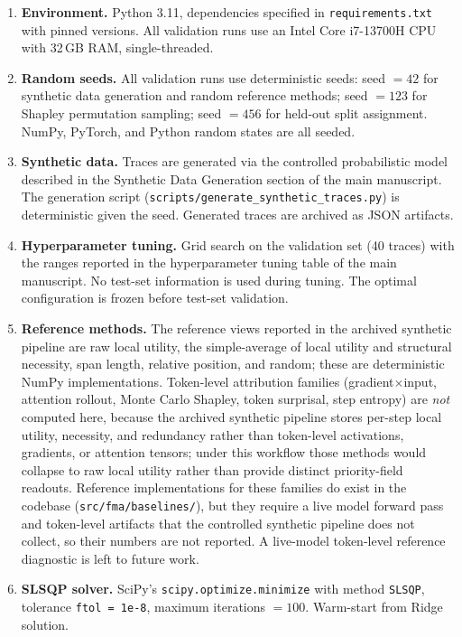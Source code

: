 \documentclass[pdflatex,sn-mathphys-num]{sn-jnl}
\begin{document}
\begin{enumerate}
\item \textbf{Environment.} Python 3.11, dependencies specified in \texttt{requirements.txt} with pinned versions. All validation runs use an Intel Core i7-13700H CPU with 32\,GB RAM, single-threaded.
\item \textbf{Random seeds.} All validation runs use deterministic seeds: seed $= 42$ for synthetic data generation and random reference methods; seed $= 123$ for Shapley permutation sampling; seed $= 456$ for held-out split assignment. NumPy, PyTorch, and Python random states are all seeded.
\item \textbf{Synthetic data.} Traces are generated via the controlled probabilistic model described in the Synthetic Data Generation section of the main manuscript. The generation script (\texttt{scripts/generate\_synthetic\_traces.py}) is deterministic given the seed. Generated traces are archived as JSON artifacts.
\item \textbf{Hyperparameter tuning.} Grid search on the validation set (40 traces) with the ranges reported in the hyperparameter tuning table of the main manuscript. No test-set information is used during tuning. The optimal configuration is frozen before test-set validation.
\item \textbf{Reference methods.} The reference views reported in the archived synthetic pipeline are raw local utility, the simple-average of local utility and structural necessity, span length, relative position, and random; these are deterministic NumPy implementations. Token-level attribution families (gradient$\times$input, attention rollout, Monte Carlo Shapley, token surprisal, step entropy) are \emph{not} computed here, because the archived synthetic pipeline stores per-step local utility, necessity, and redundancy rather than token-level activations, gradients, or attention tensors; under this workflow those methods would collapse to raw local utility rather than provide distinct priority-field readouts. Reference implementations for these families do exist in the codebase (\texttt{src/fma/baselines/}), but they require a live model forward pass and token-level artifacts that the controlled synthetic pipeline does not collect, so their numbers are not reported. A live-model token-level reference diagnostic is left to future work.
\item \textbf{SLSQP solver.} SciPy's \texttt{scipy.optimize.minimize} with method \texttt{SLSQP}, tolerance \texttt{ftol = 1e-8}, maximum iterations $= 100$. Warm-start from Ridge solution.

\end{enumerate}
\end{document}
